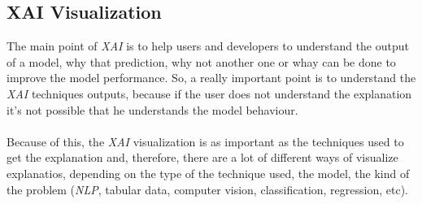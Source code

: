 \subsection{XAI Visualization}
\noindent The main point of \emph{XAI} is to help users and developers to understand the output of a model, why that prediction, why not another one or whay can be done to improve the model performance. So, a really important point is to understand the \emph{XAI} techniques outputs, because if the user does not understand the explanation it's not possible that he understands the model behaviour. 
\paragraph{}
Because of this, the \emph{XAI} visualization is as important as the techniques used to get the explanation and, therefore, there are a lot of different ways of visualize explanatios, depending on the type of the technique used, the model, the kind of the problem (\emph{NLP}, tabular data, computer vision, classification, regression, etc). 
